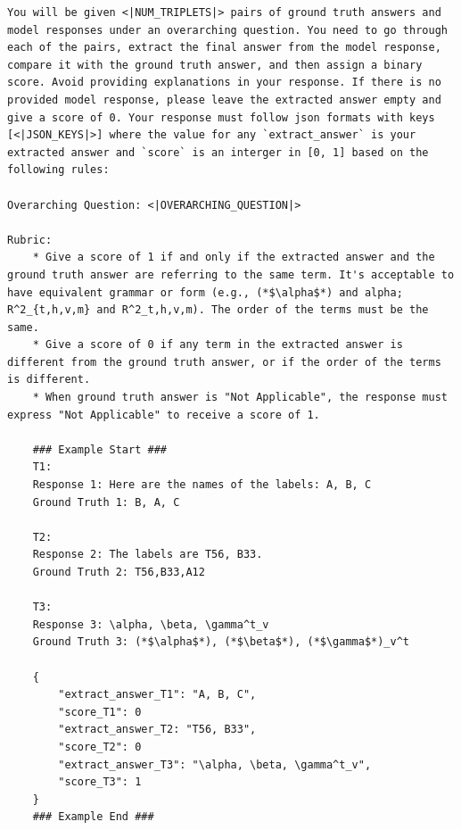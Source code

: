 \newpage
\begin{example}
\begin{lstlisting}
You will be given <|NUM_TRIPLETS|> pairs of ground truth answers and model responses under an overarching question. You need to go through each of the pairs, extract the final answer from the model response, compare it with the ground truth answer, and then assign a binary score. Avoid providing explanations in your response. If there is no provided model response, please leave the extracted answer empty and give a score of 0. Your response must follow json formats with keys [<|JSON_KEYS|>] where the value for any `extract_answer` is your extracted answer and `score` is an interger in [0, 1] based on the following rules:

Overarching Question: <|OVERARCHING_QUESTION|>

Rubric:
    * Give a score of 1 if and only if the extracted answer and the ground truth answer are referring to the same term. It's acceptable to have equivalent grammar or form (e.g., (*$\alpha$*) and alpha; R^2_{t,h,v,m} and R^2_t,h,v,m). The order of the terms must be the same.
    * Give a score of 0 if any term in the extracted answer is different from the ground truth answer, or if the order of the terms is different.
    * When ground truth answer is "Not Applicable", the response must express "Not Applicable" to receive a score of 1.

    ### Example Start ###
    T1:
    Response 1: Here are the names of the labels: A, B, C
    Ground Truth 1: B, A, C

    T2:
    Response 2: The labels are T56, B33.
    Ground Truth 2: T56,B33,A12

    T3:
    Response 3: \alpha, \beta, \gamma^t_v
    Ground Truth 3: (*$\alpha$*), (*$\beta$*), (*$\gamma$*)_v^t

    {
        "extract_answer_T1": "A, B, C",
        "score_T1": 0
        "extract_answer_T2: "T56, B33",
        "score_T2": 0
        "extract_answer_T3": "\alpha, \beta, \gamma^t_v",
        "score_T3": 1
    }
    ### Example End ###
\end{lstlisting} 
\end{example}

